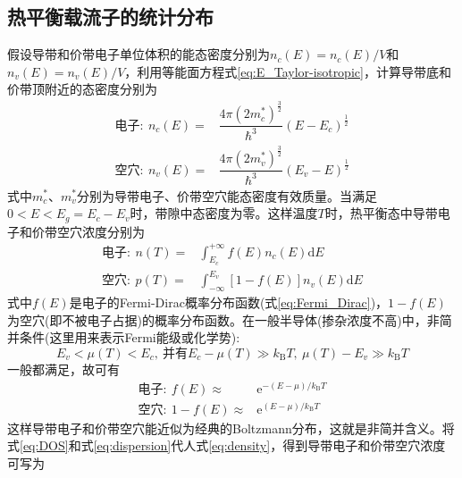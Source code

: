 \subsection{热平衡载流子的统计分布} 
假设导带和价带电子单位体积的能态密度分别为$n_c(E)=n_c(E)/V$和$n_v(E)=n_v(E)/V$，利用等能面方程式\eqref{eq:E_Taylor-isotropic}，计算导带底和价带顶附近的态密度分别为
\begin{subequations}
	\begin{align}
		\mbox{电子}:~n_c(E)=&\dfrac{4\pi(2m_c^{\ast})^{\frac32}}{\hbar^3}(E-E_c)^{\frac12}\label{eq:DOS-n_c}\\
		\mbox{空穴}:~n_v(E)=&\dfrac{4\pi(2m_v^{\ast})^{\frac32}}{\hbar^3}(E_v-E)^{\frac12} \label{eq:DOS-n_v}
	\end{align}
	\label{eq:DOS}
\end{subequations}
式中$m_c^{\ast}$、$m_v^{\ast}$分别为导带电子、价带空穴能态密度有效质量。当满足$0<E<E_g=E_c-E_v$时，带隙中态密度为零。这样温度$T$时，热平衡态中导带电子和价带空穴浓度分别为
\begin{subequations}
	\begin{align}
		\mbox{电子}:~n(T)=&\int_{E_c}^{+\infty}f(E)n_c(E)\mathrm{d}E\label{eq:density-n_T}\\
		\mbox{空穴}:~p(T)=&\int_{-\infty}^{E_v}[1-f(E)]n_v(E)\mathrm{d}E \label{eq:density-p_T}
	\end{align}
	\label{eq:density}
\end{subequations} 
式中$f(E)$是电子的Fermi-Dirac概率分布函数(式\eqref{eq:Fermi_Dirac})，$1-f(E)$为空穴(即不被电子占据)的概率分布函数。在一般半导体(掺杂浓度不高)中，非简并条件(这里用来表示Fermi能级或化学势):
\begin{equation}
	E_v<\mu(T)<E_c,~\mbox{并有}E_c-\mu(T)\gg k_{\mathrm{B}}T,~\mu(T)-E_v\gg k_{\mathrm{B}}T
	\label{eq:Fermi_energy-chemical_potential}
\end{equation}
一般都满足，故可有
\begin{subequations}
	\begin{align}
		\mbox{电子}:~f(E)\approx&\mathrm{e}^{-(E-\mu)/k_{\mathrm{B}}T}\label{eq:dispersion-n_c}\\
		\mbox{空穴}:~1-f(E)\approx&\mathrm{e}^{(E-\mu)/k_{\mathrm{B}}T} \label{eq:dispersion-p_v}
	\end{align}
	\label{eq:dispersion}
\end{subequations} 
这样导带电子和价带空穴能近似为经典的Boltzmann分布，这就是非简并含义。将式\eqref{eq:DOS}和式\eqref{eq:dispersion}代人式\eqref{eq:density}，得到导带电子和价带空穴浓度可写为
